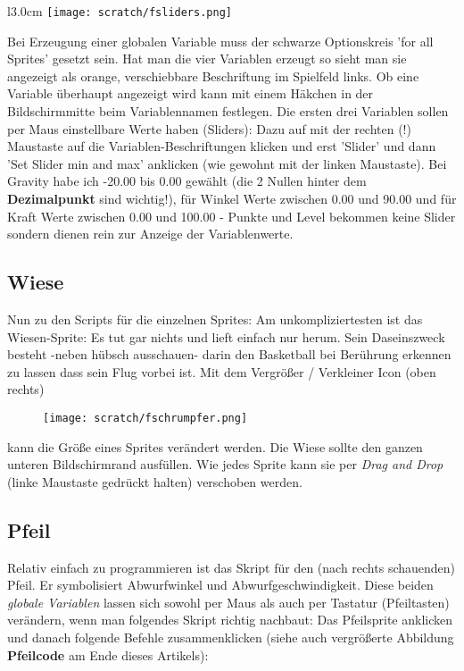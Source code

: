 \documentclass[10pt,a4paper,ngerman,twoside]{article} %
\begin{document}
\begin{wrapfigure}{l}{3.0cm}
\texttt{[image: scratch/fsliders.png]}
\end{wrapfigure}
Bei Erzeugung einer globalen Variable muss der schwarze Optionskreis 'for all Sprites' gesetzt sein. Hat man die vier Variablen erzeugt so sieht man sie angezeigt als
orange, verschiebbare Beschriftung im Spielfeld links. Ob eine Variable überhaupt angezeigt wird kann mit einem Häkchen in der Bildschirmmitte beim Variablennamen festlegen. Die ersten drei Variablen sollen per Maus einstellbare Werte haben (Sliders): Dazu auf mit der rechten (!) Maustaste auf die Variablen-Beschriftungen klicken und erst 'Slider' und dann 'Set Slider min and max' anklicken (wie gewohnt mit der linken Maustaste). Bei Gravity habe ich -20.00 bis 0.00 gewählt (die 2 Nullen hinter dem \textbf{Dezimalpunkt} sind wichtig!), für Winkel Werte zwischen 0.00 und 90.00 und für Kraft Werte zwischen 0.00 und 100.00 - Punkte und Level bekommen keine Slider sondern dienen rein zur Anzeige der Variablenwerte.



\subsection*{Wiese}

Nun zu den Scripts für die einzelnen Sprites: Am unkompliziertesten ist das Wiesen-Sprite: Es tut gar nichts und lieft einfach nur herum. Sein Daseinszweck besteht -neben hübsch ausschauen- darin den Basketball bei Berührung erkennen zu lassen dass sein Flug vorbei ist. Mit dem Vergrößer / Verkleiner Icon (oben rechts) 

\begin{figure}
\texttt{[image: scratch/fschrumpfer.png]}
\end{figure}

kann die Größe eines Sprites verändert werden. Die Wiese sollte den ganzen unteren Bildschirmrand ausfüllen. Wie jedes Sprite kann sie per \textit{Drag and Drop} (linke Maustaste gedrückt halten) verschoben werden.

\subsection*{Pfeil}

Relativ einfach zu programmieren ist das Skript für den (nach rechts schauenden) Pfeil. Er symbolisiert Abwurfwinkel und Abwurfgeschwindigkeit. Diese beiden \textit{globale Variablen} lassen sich sowohl per Maus als auch per Tastatur (Pfeiltasten) verändern, wenn man folgendes Skript richtig nachbaut: Das Pfeilsprite anklicken und danach folgende Befehle zusammenklicken (siehe auch vergrößerte Abbildung \textbf{Pfeilcode} am Ende dieses Artikels):
\end{document}
